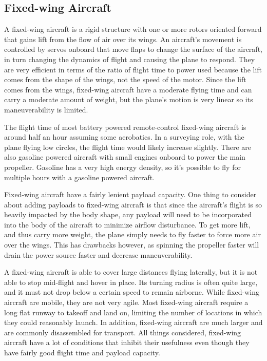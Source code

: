 \subsection{Fixed-wing Aircraft}
A fixed-wing aircraft is a rigid structure with one or more rotors oriented forward that gains lift from the flow of air over its wings. An aircraft’s movement is controlled by servos onboard that move flaps to change the surface of the aircraft, in turn changing the dynamics of flight and causing the plane to respond. They are very efficient in terms of the ratio of flight time to power used because the lift comes from the shape of the wings, not the speed of the motor. Since the lift comes from the wings, fixed-wing aircraft have a moderate flying time and can carry a moderate amount of weight, but the plane’s motion is very linear so its maneuverability is limited.\par
The flight time of most battery powered remote-control fixed-wing aircraft is around half an hour assuming some aerobatics. In a surveying role, with the plane flying low circles, the flight time would likely increase slightly. There are also gasoline powered aircraft with small engines onboard to power the main propeller. Gasoline has a very high energy density, so it’s possible to fly for multiple hours with a gasoline powered aircraft.\par
Fixed-wing aircraft have a fairly lenient payload capacity. One thing to consider about adding payloads to fixed-wing aircraft is that since the aircraft’s flight is so heavily impacted by the body shape, any payload will need to be incorporated into the body of the aircraft to minimize airflow disturbance. To get more lift, and thus carry more weight, the plane simply needs to fly faster to force more air over the wings. This has drawbacks however, as spinning the propeller faster will drain the power source faster and decrease maneuverability.\par
A fixed-wing aircraft is able to cover large distances flying laterally, but it is not able to stop mid-flight and hover in place. Its turning radius is often quite large, and it must not drop below a certain speed to remain airborne. While fixed-wing aircraft are mobile, they are not very agile. Most fixed-wing aircraft require a long flat runway to takeoff and land on, limiting the number of locations in which they could reasonably launch. In addition, fixed-wing aircraft are much larger and are commonly disassembled for transport. All things considered, fixed-wing aircraft have a lot of conditions that inhibit their usefulness even though they have fairly good flight time and payload capacity.

